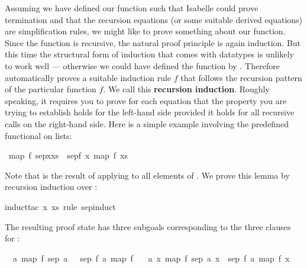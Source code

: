 %
\begin{isabellebody}%
\def\isabellecontext{Induction}%
\isamarkupfalse%
%
\begin{isamarkuptext}%
Assuming we have defined our function such that Isabelle could prove
termination and that the recursion equations (or some suitable derived
equations) are simplification rules, we might like to prove something about
our function. Since the function is recursive, the natural proof principle is
again induction. But this time the structural form of induction that comes
with datatypes is unlikely to work well --- otherwise we could have defined the
function by . Therefore  automatically
proves a suitable induction rule $f$ that follows the
recursion pattern of the particular function $f$. We call this
\textbf{recursion induction}. Roughly speaking, it
requires you to prove for each  equation that the property
you are trying to establish holds for the left-hand side provided it holds
for all recursive calls on the right-hand side. Here is a simple example
involving the predefined  functional on lists:%
\end{isamarkuptext}%
\isamarkuptrue%
\ {\isachardoublequote}map\ f\ {\isacharparenleft}sep{\isacharparenleft}x{\isacharcomma}xs{\isacharparenright}{\isacharparenright}\ {\isacharequal}\ sep{\isacharparenleft}f\ x{\isacharcomma}\ map\ f\ xs{\isacharparenright}{\isachardoublequote}\isamarkupfalse%
%
\begin{isamarkuptxt}%
\noindent
Note that 
is the result of applying  to all elements of . We prove
this lemma by recursion induction over :%
\end{isamarkuptxt}%
\isamarkuptrue%
induct{\isacharunderscore}tac\ x\ xs\ rule{\isacharcolon}\ sep{\isachardot}induct{\isacharparenright}\isamarkupfalse%
%
\begin{isamarkuptxt}%
\noindent
The resulting proof state has three subgoals corresponding to the three
clauses for :
\begin{isabelle}%
\ {}{\isachardot}\ {\isasymAnd}a{\isachardot}\ map\ f\ {\isacharparenleft}sep\ {\isacharparenleft}a{\isacharcomma}\ {\isacharbrackleft}{\isacharbrackright}{\isacharparenright}{\isacharparenright}\ {\isacharequal}\ sep\ {\isacharparenleft}f\ a{\isacharcomma}\ map\ f\ {\isacharbrackleft}{\isacharbrackright}{\isacharparenright}\isanewline
\ {}{\isachardot}\ {\isasymAnd}a\ x{\isachardot}\ map\ f\ {\isacharparenleft}sep\ {\isacharparenleft}a{\isacharcomma}\ {\isacharbrackleft}x{\isacharbrackright}{\isacharparenright}{\isacharparenright}\ {\isacharequal}\ sep\ {\isacharparenleft}f\ a{\isacharcomma}\ map\ f\ {\isacharbrackleft}x{\isacharbrackright}{\isacharparenright}\isanewline

\end{isabelle}
\end{isamarkuptxt}
\end{isabellebody}
